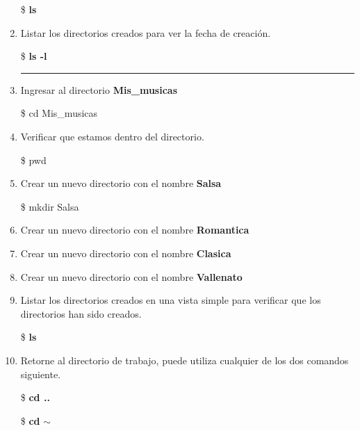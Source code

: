 \documentclass[a4paper,12pt,spanish]{article}
\begin{document}
\begin{enumerate}
\begin{tcolorbox}[colback=red!5!white,colframe=red!75!black,fonttitle=\bfseries]
    \$ \textbf{ls}
  \end{tcolorbox}
  \item Listar los directorios creados para ver la fecha de creación.
  \begin{tcolorbox}[colback=red!5!white,colframe=red!75!black,fonttitle=\bfseries]
    \$ \textbf{ls -l}
  \end{tcolorbox}
  \rule{4cm}{0.4pt}
 \item Ingresar al directorio \textbf{Mis\_musicas}
  \begin{tcolorbox}[colback=red!5!white,colframe=red!75!black,fonttitle=\bfseries]
    \$ cd Mis\_musicas
  \end{tcolorbox}
 
  \item Verificar que estamos dentro del directorio.
 \begin{tcolorbox}[colback=red!5!white,colframe=red!75!black,fonttitle=\bfseries]
    \$ pwd
  \end{tcolorbox}
  
\item Crear un nuevo directorio con el nombre \textbf{Salsa}
  \begin{tcolorbox}[colback=red!5!white,colframe=red!75!black,fonttitle=\bfseries]
    \$ mkdir Salsa
  \end{tcolorbox}
  \item Crear un nuevo directorio con el nombre \textbf{Romantica}
  \item Crear un nuevo directorio con el nombre \textbf{Clasica}
  \item Crear un nuevo directorio con el nombre \textbf{Vallenato}
  \item Listar los directorios creados en una vista simple para
  verificar que los directorios han sido creados.
  \begin{tcolorbox}[colback=red!5!white,colframe=red!75!black,fonttitle=\bfseries]
    \$ \textbf{ls}
  \end{tcolorbox}
  \item Retorne al directorio de trabajo, puede utiliza cualquier de
  los dos comandos siguiente. \\
  
  \begin{minipage}[H]{0.5\linewidth}
  \begin{tcolorbox}[colback=red!5!white,colframe=red!75!black,fonttitle=\bfseries]
    \$ \textbf{cd ..}
  \end{tcolorbox}
  \end{minipage}
  \begin{minipage}[H]{0.5\linewidth}
  \begin{tcolorbox}[colback=red!5!white,colframe=red!75!black,fonttitle=\bfseries]
    \$ \textbf{cd} $\sim$
  \end{tcolorbox}
  \end{minipage}


\end{enumerate}
\end{document}
